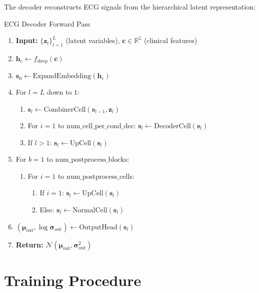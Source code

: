 \documentclass[11pt]{article}
\begin{document}
The decoder reconstructs ECG signals from the hierarchical latent representation:

\begin{algorithm}
\caption{ECG Decoder Forward Pass}
\label{alg:decoder}
\begin{enumerate}
\item \textbf{Input:} $\{\mathbf{z}_l\}_{l=1}^L$ (latent variables), $\mathbf{c} \in \mathbb{R}^{5}$ (clinical features)
\item $\mathbf{h}_c \leftarrow f_{\text{sleep}}(\mathbf{c})$
\item $\mathbf{s}_0 \leftarrow \text{ExpandEmbedding}(\mathbf{h}_c)$
\item For $l = L$ down to $1$:
    \begin{enumerate}
    \item $\mathbf{s}_l \leftarrow \text{CombinerCell}(\mathbf{s}_{l-1}, \mathbf{z}_l)$
    \item For $i = 1$ to $\text{num\_cell\_per\_cond\_dec}$: $\mathbf{s}_l \leftarrow \text{DecoderCell}(\mathbf{s}_l)$
    \item If $l > 1$: $\mathbf{s}_l \leftarrow \text{UpCell}(\mathbf{s}_l)$
    \end{enumerate}
\item For $b = 1$ to $\text{num\_postprocess\_blocks}$:
    \begin{enumerate}
    \item For $i = 1$ to $\text{num\_postprocess\_cells}$:
        \begin{enumerate}
        \item If $i = 1$: $\mathbf{s}_l \leftarrow \text{UpCell}(\mathbf{s}_l)$
        \item Else: $\mathbf{s}_l \leftarrow \text{NormalCell}(\mathbf{s}_l)$
        \end{enumerate}
    \end{enumerate}
\item $(\boldsymbol{\mu}_{\text{out}}, \log \boldsymbol{\sigma}_{\text{out}}) \leftarrow \text{OutputHead}(\mathbf{s}_l)$
\item \textbf{Return:} $\mathcal{N}(\boldsymbol{\mu}_{\text{out}}, \boldsymbol{\sigma}_{\text{out}}^2)$
\end{enumerate}
\end{algorithm}

\section{Training Procedure}
\end{document}
